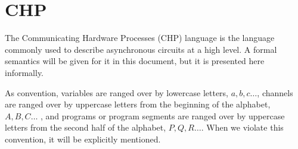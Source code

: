\documentclass[times, 10pt]{article}
\begin{document}
\section{CHP}

The Communicating Hardware Processes (CHP) language is the language commonly
used to describe asynchronous circuits at a high level.  A formal semantics will
be given for it in this document, but it is presented here informally.

As convention, variables are ranged over by lowercase letters, $a, b, c \ldots$,
channels are ranged over by uppercase letters from the beginning of the
alphabet, $A, B, C \ldots$ ,  and programs or program segments are ranged over
by uppercase letters from the second half of the alphabet, $P, Q, R \ldots$.
When we violate this convention, it will be explicitly mentioned.
\end{document}
